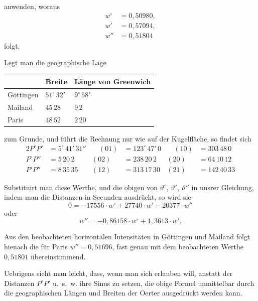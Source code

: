 \documentclass[fontsize=11pt,paper=a4,twoside,openany]{scrbook}
\begin{document}
anwenden, woraus
\[
\begin{aligned}
w^{\circ}&=0{,}50980,\\
w'&=0{,}57094,\\
w''&=0{,}51804
\end{aligned}
\]
folgt.

Legt man die geographische Lage

\begin{center}
\begin{tabular}{l@{~}|@{~}l@{~}|@{~}l}
& Breite & Länge von Greenwich \\
\hline
Göttingen & $51^{\circ}\,32'$ & $9^{\circ}\,58'$ \\
Mailand & $45\,28$ & $9\,2$ \\
Paris & $48\,52$ & $2\,20$
\end{tabular}
\end{center}

zum Grunde, und führt die Rechnung nur wie auf der Kugelfläche, so findet sich
\begin{alignat*}{2}
P^{\circ}P' &= 5^{\circ}\,41'\,31'' &\quad (01) &= 123^{\circ}\,47'\,0 &\quad (10) &= 303\,48\,0 \\
P^{\circ}P'' &= 5\,20\,2 & (02) &= 238\,20\,2 & (20) &= 64\,10\,12 \\
P'P'' &= 8\,35\,35 & (12) &= 313\,17\,30 & (21) &= 142\,40\,33
\end{alignat*}

Substituirt man diese Werthe, und die obigen von $\vartheta^{\circ}$, $\vartheta'$, $\vartheta''$ in unsrer Gleichung, indem man die Distanzen in Secunden ausdrückt, so wird sie
\[
0 = -17556\cdot w^{\circ} + 27740\cdot w' - 20377\cdot w''
\]
oder
\[
w'' = -0{,}86158\cdot w^{\circ} + 1{,}3613\cdot w'.
\]

Aus den beobachteten horizontalen Intensitäten in Göttingen und Mailand folgt hienach die für Paris $w''=0{,}51696$, fast genau mit dem beobachteten Werthe $0{,}51801$ übereinstimmend.

Uebrigens sieht man leicht, dass, wenn man sich erlauben will, anstatt der Distanzen $P^{\circ}P'$ u.~s.~w. ihre Sinus zu setzen, die obige Formel unmittelbar durch die geographischen Längen und Breiten der Oerter ausgedrückt werden kann.

\section{}
\end{document}
